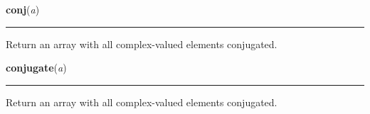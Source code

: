     \label{numpy:ndarray:conj}

    \vspace{0.5ex}

    \begin{boxedminipage}{\textwidth}

    \raggedright \textbf{conj}(\textit{a})

    \vspace{-1.5ex}

    \rule{\textwidth}{0.5\fboxrule}

Return an array with all complex-valued elements conjugated.
    \vspace{1ex}

    \end{boxedminipage}

    \label{numpy:ndarray:conjugate}

    \vspace{0.5ex}

    \begin{boxedminipage}{\textwidth}

    \raggedright \textbf{conjugate}(\textit{a})

    \vspace{-1.5ex}

    \rule{\textwidth}{0.5\fboxrule}

Return an array with all complex-valued elements conjugated.
    \vspace{1ex}

    \end{boxedminipage}

    \label{numpy:ndarray:copy}

    \vspace{0.5ex}

